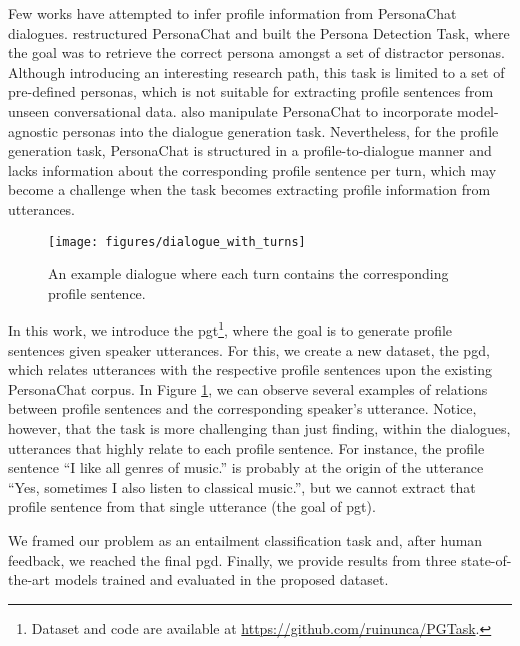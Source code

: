 \documentclass[11pt]{article}
\begin{document}
Few works have attempted to infer profile information from PersonaChat dialogues.
\citet{DETECT-SPEAKER} restructured PersonaChat and built the Persona Detection Task, where the goal was to retrieve the correct persona amongst a set of distractor personas. Although introducing an interesting research path, this task is limited to a set of pre-defined personas, which is not suitable for extracting profile sentences from unseen conversational data.
\citet{DATA-MANIPULATION-PERSONA} also manipulate PersonaChat to incorporate model-agnostic personas into the dialogue generation task. Nevertheless, for the profile generation task, PersonaChat is structured in a profile-to-dialogue manner and lacks information about the corresponding profile sentence per turn, which may become a challenge when the task becomes extracting profile information from utterances.

\begin{figure}[t]
    \centering
 \texttt{[image: figures/dialogue\_with\_turns]}
    \caption{An example dialogue where each turn contains the corresponding profile sentence.}
    \label{fig:example-dialogue}
\end{figure}

In this work, we introduce the \gls*{pgt}\footnote{Dataset and code are available at \href{https://github.com/ruinunca/PGTask}{https://github.com/ruinunca/PGTask}. }, where the goal is to generate profile sentences given speaker utterances. For this, we create a new dataset, the \gls*{pgd}, which relates utterances with the respective profile sentences upon the existing PersonaChat corpus. In Figure \ref{fig:example-dialogue}, we can observe several examples of relations between profile sentences and the corresponding speaker's utterance. Notice, however, that the task is more challenging than just finding, within the dialogues, utterances that highly relate to each profile sentence. For instance, the profile sentence ``I like all genres of music.'' is probably at the origin of the utterance ``Yes, sometimes I also listen to classical music.'', but we cannot extract that profile sentence from that single utterance (the goal of \gls*{pgt}).

We framed our problem as an entailment classification task and, after human feedback, we reached the final \gls*{pgd}. Finally, we provide results from three state-of-the-art models trained and evaluated in the proposed dataset. 
\end{document}
